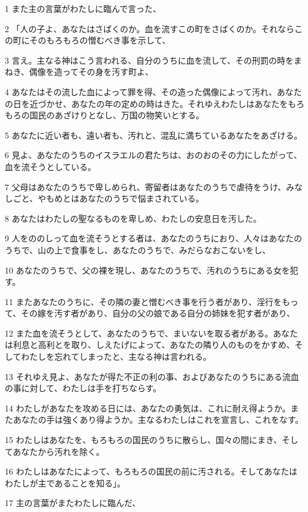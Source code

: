 \par 1 また主の言葉がわたしに臨んで言った、
\par 2 「人の子よ、あなたはさばくのか。血を流すこの町をさばくのか。それならこの町にそのもろもろの憎むべき事を示して、
\par 3 言え。主なる神はこう言われる、自分のうちに血を流して、その刑罰の時をまねき、偶像を造ってその身を汚す町よ、
\par 4 あなたはその流した血によって罪を得、その造った偶像によって汚れ、あなたの日を近づかせ、あなたの年の定めの時はきた。それゆえわたしはあなたをもろもろの国民のあざけりとなし、万国の物笑いとする。
\par 5 あなたに近い者も、遠い者も、汚れと、混乱に満ちているあなたをあざける。
\par 6 見よ、あなたのうちのイスラエルの君たちは、おのおのその力にしたがって、血を流そうとしている。
\par 7 父母はあなたのうちで卑しめられ、寄留者はあなたのうちで虐待をうけ、みなしごと、やもめとはあなたのうちで悩まされている。
\par 8 あなたはわたしの聖なるものを卑しめ、わたしの安息日を汚した。
\par 9 人をののしって血を流そうとする者は、あなたのうちにおり、人々はあなたのうちで、山の上で食事をし、あなたのうちで、みだらなおこないをし、
\par 10 あなたのうちで、父の裸を現し、あなたのうちで、汚れのうちにある女を犯す。
\par 11 またあなたのうちに、その隣の妻と憎むべき事を行う者があり、淫行をもって、その嫁を汚す者があり、自分の父の娘である自分の姉妹を犯す者があり、
\par 12 また血を流そうとして、あなたのうちで、まいないを取る者がある。あなたは利息と高利とを取り、しえたげによって、あなたの隣り人のものをかすめ、そしてわたしを忘れてしまったと、主なる神は言われる。
\par 13 それゆえ見よ、あなたが得た不正の利の事、およびあなたのうちにある流血の事に対して、わたしは手を打ちならす。
\par 14 わたしがあなたを攻める日には、あなたの勇気は、これに耐え得ようか。またあなたの手は強くあり得ようか。主なるわたしはこれを宣言し、これをなす。
\par 15 わたしはあなたを、もろもろの国民のうちに散らし、国々の間にまき、そしてあなたから汚れを除く。
\par 16 わたしはあなたによって、もろもろの国民の前に汚される。そしてあなたはわたしが主であることを知る」。
\par 17 主の言葉がまたわたしに臨んだ、
